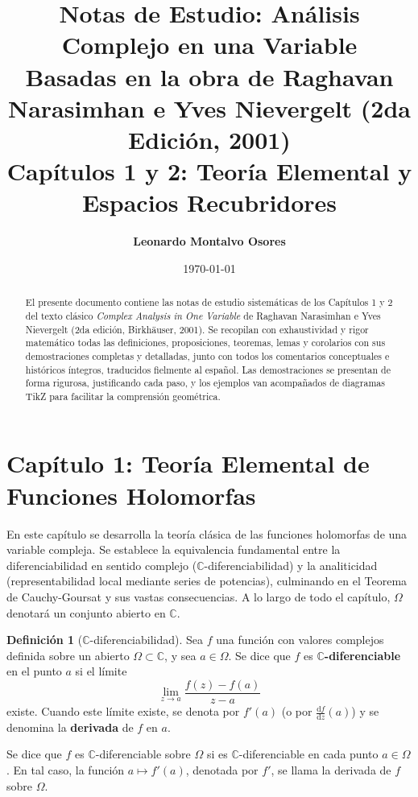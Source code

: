 \documentclass[11pt,a4paper]{article}
\title{\textbf{Notas de Estudio: Análisis Complejo en una Variable}\\
\large Basadas en la obra de Raghavan Narasimhan e Yves Nievergelt (2da Edición, 2001)\\[0.2cm]
\textbf{Capítulos 1 y 2: Teoría Elemental y Espacios Recubridores}}
\author{\textbf{Leonardo Montalvo Osores}}
\date{\today}
\theoremstyle{definition}
\newtheorem{definicion}{Definición}[section]
\theoremstyle{remark}
\numberwithin{equation}{section}
\begin{document}
\maketitle

\begin{abstract}
El presente documento contiene las notas de estudio sistemáticas de los Capítulos 1 y 2 del texto clásico \emph{Complex Analysis in One Variable} de Raghavan Narasimhan e Yves Nievergelt (2da edición, Birkhäuser, 2001). Se recopilan con exhaustividad y rigor matemático todas las definiciones, proposiciones, teoremas, lemas y corolarios con sus demostraciones completas y detalladas, junto con todos los comentarios conceptuales e históricos íntegros, traducidos fielmente al español. Las demostraciones se presentan de forma rigurosa, justificando cada paso, y los ejemplos van acompañados de diagramas TikZ para facilitar la comprensión geométrica.
\end{abstract}

\tableofcontents
\newpage


\section{Capítulo 1: Teoría Elemental de Funciones Holomorfas}

En este capítulo se desarrolla la teoría clásica de las funciones holomorfas de una variable compleja. Se establece la equivalencia fundamental entre la diferenciabilidad en sentido complejo ($\mathbb{C}$-diferenciabilidad) y la analiticidad (representabilidad local mediante series de potencias), culminando en el Teorema de Cauchy-Goursat y sus vastas consecuencias. A lo largo de todo el capítulo, $\Omega$ denotará un conjunto abierto en $\mathbb{C}$.

\begin{definicion}[$\mathbb{C}$-diferenciabilidad]
Sea $f$ una función con valores complejos definida sobre un abierto $\Omega \subset \mathbb{C}$, y sea $a \in \Omega$. Se dice que $f$ es \textbf{$\mathbb{C}$-diferenciable} en el punto $a$ si el límite
\begin{equation}
\lim_{z \to a} \frac{f(z) - f(a)}{z - a}
\end{equation}
existe. Cuando este límite existe, se denota por $f'(a)$ (o por $\frac{\mathrm{d}f}{\mathrm{d}z}(a)$) y se denomina la \textbf{derivada} de $f$ en $a$. 

Se dice que $f$ es $\mathbb{C}$-diferenciable sobre $\Omega$ si es $\mathbb{C}$-diferenciable en cada punto $a \in \Omega$. En tal caso, la función $a \mapsto f'(a)$, denotada por $f'$, se llama la derivada de $f$ sobre $\Omega$.
\end{definicion}
\end{document}
